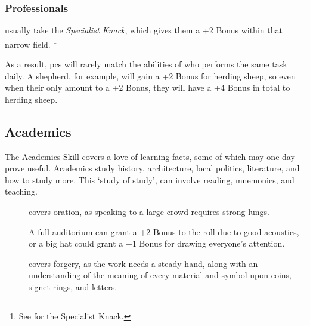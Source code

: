 \begin{multicols}{2}
\subsubsection{Professionals}
usually take the \textit{Specialist Knack}, which gives them a +2 Bonus within that narrow field.%
\footnote{See  for the Specialist Knack.}

As a result, \glspl{pc} will rarely match the abilities of  who performs the same task daily.
A shepherd, for example, will gain a +2 Bonus for herding sheep, so even when their  only amount to a +2 Bonus, they will have a +4 Bonus in total to herding sheep.

\subsection{Academics}

The Academics Skill covers a love of learning facts, some of which may one day prove useful.
Academics study history, architecture, local politics, literature, and how to study more.
This `study of study', can involve reading, mnemonics, and teaching.


\begin{description}
  \item[]
    covers oration, as speaking to a large crowd requires strong lungs.

    A full auditorium can grant a +2 Bonus to the roll due to good acoustics, or a big hat could grant a +1 Bonus for drawing everyone's attention.
  \item[]
    covers forgery, as the work needs a steady hand, along with an understanding of the meaning of every material and symbol upon coins, signet rings, and letters.


\end{description}
\end{multicols}
